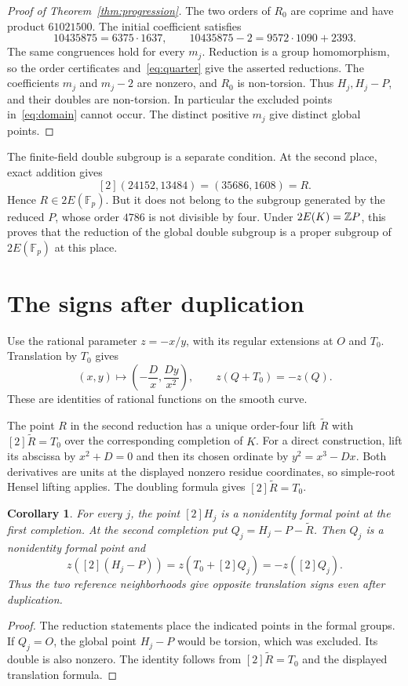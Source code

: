 \documentclass[11pt,a4paper]{article}
\newtheorem{corollary}[theorem]{Corollary}
\newcommand{\F}{\mathbb F}
\begin{document}
\begin{proof}[Proof of Theorem~\ref{thm:progression}]
The two orders of $R_0$ are coprime and have product $61021500$.
The initial coefficient satisfies
\[
 10435875=6375\cdot1637,
 \qquad10435875-2=9572\cdot1090+2393.
\]
The same congruences hold for every $m_j$. Reduction is a group
homomorphism, so the order certificates and~\eqref{eq:quarter} give
the asserted reductions. The coefficients $m_j$ and $m_j-2$ are
nonzero, and $R_0$ is non-torsion. Thus $H_j,H_j-P$, and their
doubles are non-torsion. In particular the excluded points
in~\eqref{eq:domain} cannot occur. The distinct positive $m_j$
give distinct global points.
\end{proof}

The finite-field double subgroup is a separate condition. At the second
place, exact addition gives
\begin{equation}\label{eq:finitehalf}
                   [2](24152,13484)=(35686,1608)=R.
\end{equation}
Hence $R\in2E(\F_p)$. But it does not belong to the subgroup generated
by the reduced $P$, whose order $4786$ is not divisible by four.
Under $2E(K)=\mathbb Z P$, this proves that the reduction of the global
double subgroup is a proper subgroup of $2E(\F_p)$ at this place.

\section{The signs after duplication}

Use the rational parameter $z=-x/y$, with its regular extensions at
$O$ and $T_0$. Translation by $T_0$ gives
\[
 (x,y)\longmapsto\left(-\frac D x,\frac{Dy}{x^2}\right),
 \qquad z(Q+T_0)=-z(Q).
\]
These are identities of rational functions on the smooth curve.

The point $R$ in the second reduction has a unique order-four lift
$\widetilde R$ with $[2]\widetilde R=T_0$ over the corresponding
completion of $K$. For a direct construction, lift its abscissa by
$x^2+D=0$ and then its chosen ordinate by $y^2=x^3-Dx$.
Both derivatives are units at the displayed nonzero residue coordinates,
so simple-root Hensel lifting applies. The doubling formula gives
$[2]\widetilde R=T_0$.

\begin{corollary}\label{cor:signs}
For every $j$, the point $[2]H_j$ is a nonidentity formal point at
the first completion. At the second completion put
$Q_j=H_j-P-\widetilde R$. Then $Q_j$ is a nonidentity formal point and
\[
 z([2](H_j-P))=z(T_0+[2]Q_j)=-z([2]Q_j).
\]
Thus the two reference neighborhoods give opposite translation signs
even after duplication.
\end{corollary}
\begin{proof}
The reduction statements place the indicated points in the formal
groups. If $Q_j=O$, the global point $H_j-P$ would be torsion, which
was excluded. Its double is also nonzero. The identity follows from
$[2]\widetilde R=T_0$ and the displayed translation formula.
\end{proof}
\end{document}
